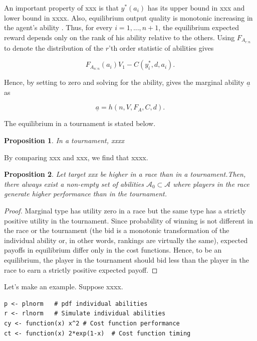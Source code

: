 \documentclass[12pt,]{article}
\theoremstyle{plain} %
\newtheorem{proposition}{Proposition}
\begin{document}
An important property of xxx is that \(y^*(a_i)\) has its upper bound in
xxx and lower bound in xxxx. Also, equilibrium output quality is
monotonic increasing in the agent's ability
\citep[see][]{moldovanu2001optimal}. Thus, for every \(i=1, ..., n+1\),
the equilibrium expected reward depends only on the rank of his ability
relative to the others. Using \({F_{A_{r:n}}}\) to denote the
distribution of the \(r\)'th order statistic of abilities gives

\begin{equation} \label{equilibrium payoffs tournament}
  {F_{A_{n:n}}}(a_i) V_1  - C(y_i^*, d, a_i).
\end{equation}

Hence, by setting to zero and solving for the ability, gives the
marginal ability \({\underline a}\) as

\begin{equation}
  {\underline a}= h(n, V, F_A, C, d).
\end{equation}

The equilibrium in a tournament is stated below.

\begin{proposition}
  In a tournament, xxxx 
\end{proposition}

By comparing xxx and xxx, we find that xxxx.

\begin{proposition}
Let target xxx be higher in a race than in a tournament.Then, there always exist a non-empty set of abilities $\mathcal A_0 \subset \mathcal A$ where players in the race generate higher performance than in the tournament.  
\end{proposition}

\begin{proof}
Marginal type has utility zero in a race but the same type has a strictly positive utility in the tournament. Since probability of winning is not different in the race or the tournament (the bid is a monotonic transformation of the individual ability or, in other words, rankings are virtually the same), expected payoffs in equilibrium differ only in the cost functions. Hence, to be an equilibrium, the player in the tournament should bid less than the player in the race to earn a strictly positive expected payoff. 
\end{proof}

Let's make an example. Suppose xxxx.

\begin{verbatim}
p <- plnorm   # pdf individual abilities 
r <- rlnorm   # Simulate individual abilities
cy <- function(x) x^2 # Cost function performance
ct <- function(x) 2*exp(1-x)  # Cost function timing 
\end{verbatim}
\end{document}
